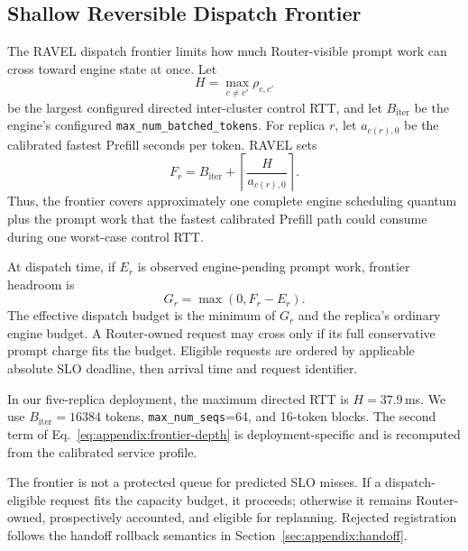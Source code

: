 \subsection{Shallow Reversible Dispatch Frontier}
\label{sec:appendix:frontier}

The RAVEL dispatch frontier limits how much Router-visible prompt work can
cross toward engine state at once.
Let
\begin{equation}
    H
    =
    \max_{c\neq c'}
       \rho_{c,c'}
    \label{eq:appendix:control-horizon}
\end{equation}
be the largest configured directed inter-cluster control RTT, and let
$B_{\mathrm{iter}}$ be the engine's configured
\texttt{max\_num\_batched\_tokens}.
For replica $r$, let $a_{c(r),0}$ be the calibrated fastest Prefill seconds per
token.
RAVEL sets
\begin{equation}
    F_r
    =
    B_{\mathrm{iter}}
    +
    \left\lceil
       \frac{H}{a_{c(r),0}}
    \right\rceil .
    \label{eq:appendix:frontier-depth}
\end{equation}
Thus, the frontier covers approximately one complete engine scheduling
quantum plus the prompt work that the fastest calibrated Prefill path could
consume during one worst-case control RTT.

At dispatch time, if $E_r$ is observed engine-pending prompt work, frontier
headroom is
\begin{equation}
    G_r
    =
    \max(0,F_r-E_r).
    \label{eq:appendix:frontier-headroom}
\end{equation}
The effective dispatch budget is the minimum of $G_r$ and the replica's
ordinary engine budget.
A Router-owned request may cross only if its full conservative prompt charge
fits the budget.
Eligible requests are ordered by applicable absolute SLO deadline, then
arrival time and request identifier.

In our five-replica deployment, the maximum directed RTT is
$H=37.9$\,ms.
We use $B_{\mathrm{iter}}=16384$ tokens,
\texttt{max\_num\_seqs}=64, and 16-token blocks.
The second term of Eq.~\ref{eq:appendix:frontier-depth} is deployment-specific
and is recomputed from the calibrated service profile.

The frontier is not a protected queue for predicted SLO misses.
If a dispatch-eligible request fits the capacity budget, it proceeds;
otherwise it remains Router-owned, prospectively accounted, and eligible for
replanning.
Rejected registration follows the handoff rollback semantics in
Section~\ref{sec:appendix:handoff}.


